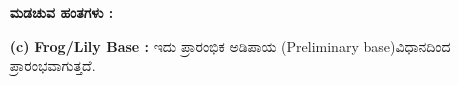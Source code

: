 \begin{enumerate}
\noindent
\textbf{ಮಡಚುವ ಹಂತಗಳು :}
\begin{figure}[H]
\end{figure}
\begin{figure}[H]
\end{figure}

\item[{\bf (c)}]  \textbf{Frog/Lily Base :} ಇದು ಪ್ರಾರಂಭಿಕ ಅಡಿಪಾಯ (Preliminary base)\break ವಿಧಾನದಿಂದ ಪ್ರಾರಂಭವಾಗುತ್ತದೆ.

\vspace{-.3cm}


\end{enumerate}
